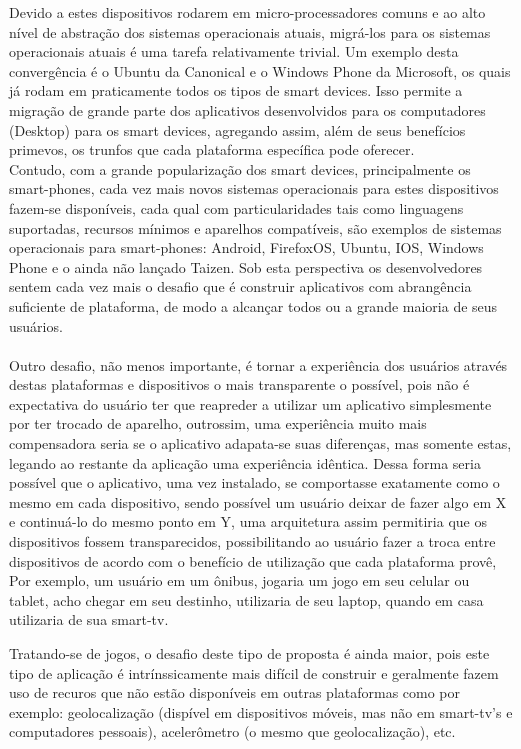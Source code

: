 \documentclass{article}
\begin{document}
 Devido a estes dispositivos rodarem em micro-processadores comuns e ao alto nível de abstração dos sistemas operacionais atuais, migrá-los para os sistemas operacionais atuais é uma tarefa relativamente trivial. Um exemplo desta convergência é o Ubuntu da Canonical e o Windows Phone da Microsoft, os quais já rodam em praticamente todos os tipos de smart devices. Isso permite a migração de grande parte dos aplicativos desenvolvidos para os computadores (Desktop) para os smart devices, agregando assim, além de seus benefícios primevos, os trunfos que cada plataforma específica pode oferecer.
 \\
 Contudo, com a grande popularização dos smart devices, principalmente os smart-phones, cada vez mais novos sistemas operacionais para estes dispositivos fazem-se disponíveis, cada qual com particularidades tais como linguagens suportadas, recursos mínimos e aparelhos compatíveis, são exemplos de sistemas operacionais para smart-phones: Android, FirefoxOS, Ubuntu, IOS, Windows Phone e o ainda não lançado Taizen. Sob esta perspectiva os desenvolvedores sentem cada vez mais o desafio que é construir aplicativos com abrangência suficiente de plataforma, de modo a alcançar todos ou a grande maioria de seus usuários. 
\\
 \\
 Outro desafio, não menos importante, é tornar a experiência dos usuários através destas plataformas e dispositivos o mais transparente o possível, pois não é expectativa do usuário ter que reapreder a utilizar um aplicativo simplesmente por ter trocado de aparelho, outrossim, uma experiência muito mais compensadora seria se o aplicativo adapata-se suas diferenças, mas somente estas, legando ao restante da aplicação uma experiência idêntica. Dessa forma seria possível que o aplicativo, uma vez instalado, se comportasse exatamente como o mesmo em cada dispositivo, sendo possível um usuário deixar de fazer algo em X e continuá-lo do mesmo ponto em Y, uma arquitetura assim permitiria que os dispositivos fossem transparecidos, possibilitando ao usuário fazer a troca entre dispositivos de acordo com o benefício de utilização que cada plataforma provê, Por exemplo, um usuário em um ônibus, jogaria um jogo em seu celular ou tablet, acho chegar em seu destinho, utilizaria de seu laptop, quando em casa utilizaria de sua smart-tv.

 Tratando-se de jogos, o desafio deste tipo de proposta é ainda maior, pois este tipo de aplicação é intrínssicamente mais difícil de construir e geralmente fazem uso de recuros que não estão disponíveis em outras plataformas como por exemplo: geolocalização (dispível em dispositivos móveis, mas não em smart-tv's e computadores pessoais), acelerômetro (o mesmo que geolocalização), etc. 
\end{document}

